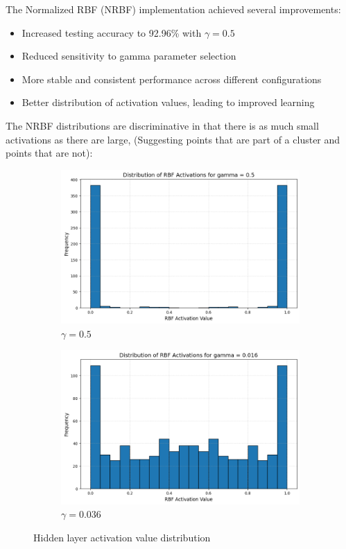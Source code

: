 \documentclass[11pt]{article}
\begin{document}
The Normalized RBF (NRBF) implementation achieved several improvements:
\begin{itemize}
    \item Increased testing accuracy to 92.96\% with $\gamma=0.5$
    \item Reduced sensitivity to gamma parameter selection
    \item More stable and consistent performance across different configurations
    \item Better distribution of activation values, leading to improved learning
\end{itemize}

The NRBF distributions are discriminative in that there is as much small activations as there are large, (Suggesting points that are part of a cluster and points that are not):

\begin{figure}[H]
  \centering
  \begin{subfigure}{0.45\linewidth}
      \centering
      \includegraphics[width=\linewidth]{img/NRBF_Activation_500.png}
      \caption{$\gamma=0.5$}
  \end{subfigure}
  \hfill
  \begin{subfigure}{0.45\linewidth}
      \centering
      \includegraphics[width=\linewidth]{img/NRBF_Activation_16.png}
      \caption{$\gamma=0.036$}
      \label{fig:nrbf-dist-16}
  \end{subfigure}
  \caption{Hidden layer activation value distribution}
  \label{fig:nrbf-dist}
\end{figure}
\end{document}
